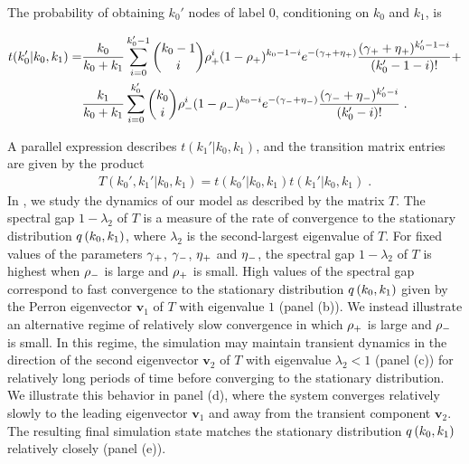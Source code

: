 \documentclass[aps,pre,reprint,superscriptaddress,nofootinbib]{revtex4-2}
\providecommand{\DIFaddtex}[1]{{\protect\color{blue}\uwave{#1}}} %
\providecommand{\DIFaddbegin}{} %
\providecommand{\DIFaddend}{} %
\providecommand{\DIFadd}[1]{\texorpdfstring{\DIFaddtex{#1}}{#1}} %
\providecommand{\DIFaddincludegraphics}[2][]{{\color{blue}\fbox{\DIFOincludegraphics[#1]{#2}}}} %
\DeclareRobustCommand{\DIFaddbegin}{\DIFOaddbegin \let\includegraphics\DIFaddincludegraphics} %
\DeclareRobustCommand{\DIFaddend}{\DIFOaddend \let\includegraphics\DIFOincludegraphics} %
\begin{document}
    The probability of obtaining $k_0'$ nodes of label 0, conditioning on $k_0$ and $k_1$, is \DIFaddbegin \DIFadd{therefore 
    }\DIFaddend \begin{widetext}
        \begin{align*}
            t(k_0' | k_0, k_1) =& \frac{k_0}{k_0 + k_1} \sum_{i=0}^{k_0' - 1} \binom{k_0 - 1}{i} \rho{}_+^i (1 - \rho{}_+)^{k_0 - 1 - i} 
            e^{-(\gamma{}_+ + \eta{}_+)} \frac{(\gamma{}_+ + \eta{}_+)^{k_0' - 1 - i}}{(k_0' - 1 - i)!}  + \\ 
            & \frac{k_1}{k_0 + k_1} \sum_{i=0}^{k_0'} \binom{k_0}{i} \rho{}_-^i (1 - \rho{}_-)^{k_0 - i} 
            e^{-(\gamma{}_- + \eta{}_-)} \frac{(\gamma{}_- + \eta{}_-)^{k_0' - i}}{(k_0' - i)!}\;.
        \end{align*}
    \end{widetext}
    A parallel expression describes $t(k_1' | k_0, k_1)$, and the transition matrix entries are given by the product 
    \begin{align*}
        T(k_0', k_1' | k_0, k_1) = t(k_0' | k_0, k_1) t(k_1' | k_0, k_1) \;.
    \end{align*}
    In , we study the dynamics of our \model{} model as described by the matrix $T$. 
    The spectral gap $1 - \lambda_2$ of $T$ is a measure of the rate of convergence to the stationary distribution $q \left( k_0, k_1 \right)$, where $\lambda_2$ is the second-largest eigenvalue of $T$.
    For fixed values of the parameters $\gamma{}_+$, $\gamma{}_-$, $\eta{}_+$ and $\eta{}_-$, the spectral gap $1 - \lambda_2$ of $T$ is highest when $\rho_-$ is large and $\rho_+$ is small. 
    High values of the spectral gap correspond to fast convergence to the stationary distribution $q \left( k_0, k_1 \right)$ given by the Perron eigenvector $\mathbf{v}_1$ of $T$ with eigenvalue $1$ (panel (b)). 
    We instead illustrate an alternative regime of relatively slow convergence in which $\rho_+$ is large and $\rho_-$ is small.
    In this regime, the simulation may maintain transient dynamics in the direction of the second eigenvector $\mathbf{v}_2$ of $T$ with eigenvalue $\lambda_2 < 1$ (panel (c)) for relatively long periods of time before converging to the stationary distribution. 
    We illustrate this behavior in panel (d), where the system converges relatively slowly to the leading eigenvector $\mathbf{v}_1$ and away from the transient component $\mathbf{v}_2$. 
    The resulting final simulation state matches the stationary distribution $q \left( k_0, k_1 \right)$ relatively closely (panel (e)).
\end{document}
